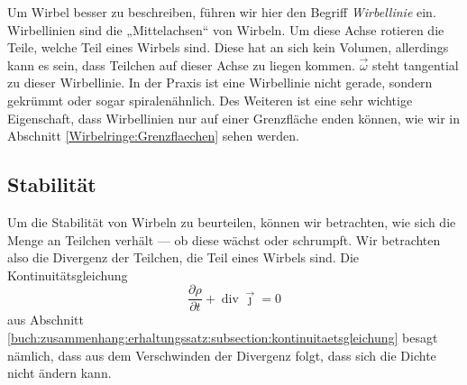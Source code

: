 Um Wirbel besser zu beschreiben, führen wir hier den Begriff {\em Wirbellinie} ein.
Wirbellinien sind die „Mittelachsen“ von Wirbeln. 
Um diese Achse rotieren die Teile, welche Teil eines Wirbels sind. 
Diese hat an sich kein Volumen, allerdings kann es sein, dass Teilchen auf dieser Achse zu liegen kommen. 
\(\vec{\omega}\) steht tangential zu dieser Wirbellinie.  
In der Praxis ist eine Wirbellinie nicht gerade, sondern gekrümmt oder sogar spiralenähnlich. 
Des Weiteren ist eine sehr wichtige Eigenschaft, dass Wirbellinien nur auf einer Grenzfläche enden können, 
wie wir in Abschnitt \ref{Wirbelringe:Grenzflaechen} sehen werden.

\subsection{Stabilität}

Um die Stabilität von Wirbeln zu beurteilen, können wir betrachten, wie sich die Menge an Teilchen verhält --- ob diese wächst oder schrumpft. 
Wir betrachten also die Divergenz der Teilchen, die Teil eines Wirbels sind.
Die Kontinuitätsgleichung 
\[
\frac{\partial \rho}{\partial t}
+
\operatorname{div}\vec{\jmath}
=
0
\]
aus Abschnitt \ref{buch:zusammenhang:erhaltungssatz:subsection:kontinuitaetsgleichung} besagt nämlich, dass aus dem Verschwinden der Divergenz folgt, dass sich die Dichte nicht ändern kann.

